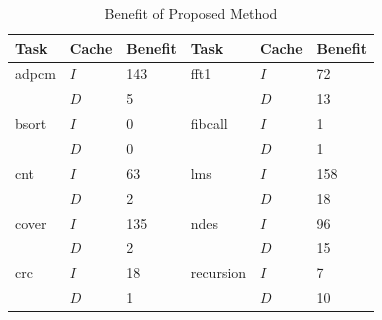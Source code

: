 \begin{table}[h!]
\small
\begin{minipage}{\linewidth}
\centering
    \begin{tabular}{l | l | l | l | l | l}
      Task & Cache & Benefit & Task & Cache & Benefit\\
      \hline

      adpcm & ${I}$ & 143 & fft1 & ${I}$ & 72 \\
            & ${D}$ & 5 & & ${D}$ & 13\\
      \hline

      bsort & ${I}$ & 0 & fibcall & ${I}$ & 1 \\
            & ${D}$ & 0 & & ${D}$ & 1 \\
      \hline

      cnt & ${I}$ & 63 & lms & ${I}$ & 158 \\
          & ${D}$ & 2 & & ${D}$ & 18 \\
      \hline

      cover & ${I}$ & 135 & ndes & ${I}$ & 96 \\
            & ${D}$ & 2 & & ${D}$ & 15 \\
      \hline

      crc & ${I}$ & 18 & recursion & ${I}$ & 7 \\
          & ${D}$ & 1 & & ${D}$ & 10  \\
      \hline

    \end{tabular}
    \bigskip
    \caption {Benefit of Proposed Method}
    \label{tab:proposed_method_benefit}
%
\end{minipage}
\normalsize
\vspace{-20pt}
\end{table}
%
%
%
%
